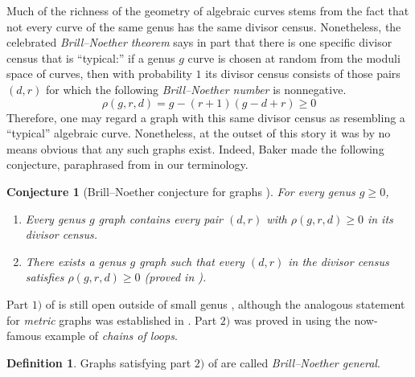 \documentclass[11pt]{article}
\newtheorem{conjecture}[theo]{Conjecture}
\theoremstyle{definition}
\newtheorem{defi}[theo]{Definition}
\numberwithin{equation}{section}
\begin{document}
Much of the richness of the geometry of algebraic curves stems from the fact that not every curve of the same genus has the same divisor census. Nonetheless, the celebrated \emph{Brill--Noether theorem} \cite{gh80} says in part that there is one specific divisor census that is ``typical:'' if a genus $g$ curve is chosen at random from the moduli space of curves, then with probability $1$ its divisor census consists of those pairs $(d,r)$ for which the following \emph{Brill--Noether number} is nonnegative.
$$
\rho(g,r,d) = g - (r+1)(g-d+r) \geq 0
$$
Therefore, one may regard a graph with this same divisor census as resembling a ``typical'' algebraic curve. Nonetheless, at the outset of this story it was by no means obvious that any such graphs exist. Indeed, Baker made the following conjecture, paraphrased from \cite[Conjecture 3.9]{BakerSpec} in our terminology.

\begin{conjecture}[Brill--Noether conjecture for graphs \cite{BakerSpec}]
\label{conj:bn}
For every genus $g \geq 0$,
\begin{enumerate}[label = \arabic*)]
    \item Every genus $g$ graph contains every pair $(d,r)$ with $\rho(g,r,d) \geq 0$ in its divisor census.
    \item There exists a genus $g$ graph such that every $(d,r)$ in the divisor census satisfies $\rho(g,r,d) \geq 0$ (proved in \cite{CDPR12}).
\end{enumerate}
\end{conjecture}

Part $1)$ of  is still open outside of small genus \cite{atanasovRanganathan}, although the analogous statement for \emph{metric} graphs was established in \cite{BakerSpec}. Part $2)$ was proved in \cite{CDPR12} using the now-famous example of \emph{chains of loops}. 

\begin{defi}
Graphs satisfying part $2)$ of  are called \emph{Brill--Noether general}.
\end{defi}
\end{document}
